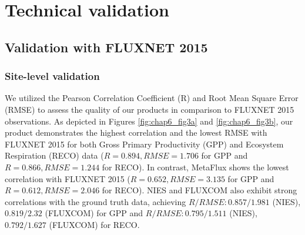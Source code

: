 \section{Technical validation}
\subsection{Validation with FLUXNET 2015}
\subsubsection*{Site-level validation}
We utilized the Pearson Correlation Coefficient (R) and Root Mean Square Error (RMSE) to assess the quality of our products in comparison to FLUXNET 2015 observations. As depicted in Figures \ref{fig:chap6_fig3a} and \ref{fig:chap6_fig3b}, our product demonstrates the highest correlation and the lowest RMSE with FLUXNET 2015 for both Gross Primary Productivity (GPP) and Ecosystem Respiration (RECO) data ($R = 0.894, RMSE = 1.706$ for GPP and $R = 0.866, RMSE = 1.244$ for RECO). In contrast, MetaFlux shows the lowest correlation with FLUXNET 2015 ($R = 0.652, RMSE = 3.135$ for GPP and $R = 0.612, RMSE = 2.046$ for RECO). NIES and FLUXCOM also exhibit strong correlations with the ground truth data, achieving $R/RMSE: 0.857/1.981$ (NIES), $0.819/2.32$ (FLUXCOM) for GPP and $R/RMSE: 0.795/1.511$ (NIES), $0.792/1.627$ (FLUXCOM) for RECO. \par

